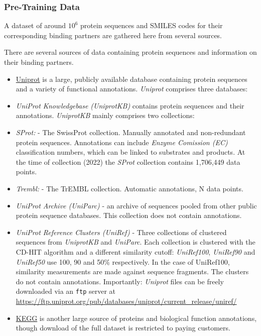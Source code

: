 \documentclass[16pt]{book}
\begin{document}
\subsubsection{Pre-Training Data}

A dataset of around $10^6$ protein sequences and SMILES codes for their corresponding binding partners are gathered here from several sources.

There are several sources of data containing protein sequences and information on their binding partners.

\begin{itemize}
	\item \href{https://www.uniprot.org/}{Uniprot} is a large, publicly available database containing protein sequences and a variety of functional annotations. 
		\textit{Uniprot} comprises three databases:
	\item \textit{UniProt Knowledgebase (UniprotKB)} contains protein sequences and their annotations.
		\textit{UniprotKB} mainly comprises two collections:
\item \textit{SProt:} - The SwissProt collection. Manually annotated and non-redundant protein sequences. 
	Annotations can include \textit{Enzyme Comission (EC)} classification numbers, which can be linked to substrates and products. 
		At the time of collection (2022) the \textit{SProt} collection contains 1,706,449 data points.
	\item \textit{Trembl:} - The TrEMBL collection. Automatic annotations, N data points.
	\item \textit{UniProt Archive (UniParc)} - an archive of sequences pooled from other public protein sequence databases.
	This collection does not contain annotations.
\item \textit{UniProt Reference Clusters (UniRef)} - Three collections of clustered sequences from \textit{UniprotKB} and \textit{UniParc}. 
	Each collection is clustered with the CD-HIT algorithm and a different similarity cutoff: \textit{UniRef100}, \textit{UniRef90} and \textit{UniRef50} use 100, 90 and 50\% respectively.
	In the case of UniRef100, similarity measurements are made against sequence fragments.
	The clusters do not contain annotations.
		Importantly: \textit{Uniprot} files can be freely downloaded via an \texttt{ftp} server at \href{https://ftp.uniprot.org/pub/databases/uniprot/current_release/uniref/}{https://ftp.uniprot.org/pub/databases/uniprot/current\_release/uniref/}
	\item \href{https://www.genome.jp/kegg/}{KEGG} is another large source of proteins and biological function annotations, though download of the full dataset is restricted to paying customers.

\end{itemize}
\end{document}
